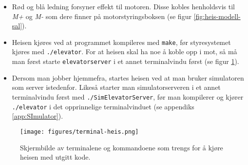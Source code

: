 \begin{alphasection}
\begin{itemize}
    \item Rød og blå ledning forsyner effekt til motoren. Disse kobles henholdsvis til \textit{M+} og \textit{M-} som dere finner på motorstyringsboksen (se figur \ref{fig:heis-modell-sal}).
    \item Heisen kjøres ved at programmet kompileres med \verb|make|, før styresystemet kjøres med \verb|./elevator|. For at heisen skal ha noe å koble opp i mot, så må man først starte  \verb|elevatorserver|  i et annet terminalvindu først (se figur \ref{fig:terminal-oppstart-heis}).
    \item Dersom man jobber hjemmefra, startes heisen ved at man bruker simulatoren som server istedenfor. Likeså starter man simulatorserveren i et annet terminalvindu først med \verb|./SimElevatorServer|, før man kompilerer og kjører \verb|./elevator| i det opprinnelige terminalvinduet (se appendiks \ref{app:SImulator}).
\end{itemize}

\begin{figure}[ht]
    \centering
    \texttt{[image: figures/terminal-heis.png]}
    \caption{Skjermbilde av terminalene og kommandoene som trengs for å kjøre heisen med utgitt kode.}
    \label{fig:terminal-oppstart-heis}
\end{figure}




\end{alphasection}
\clearpage


\setcounter{section}{0}

